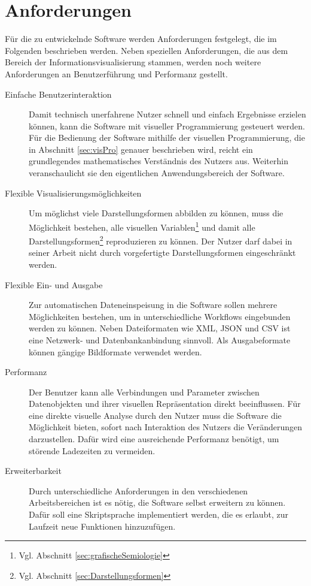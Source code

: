 \documentclass[a4paper, 
               12pt,
               DIV=calc,
               version=first,
               pdftex,
               headsepline,
               footsepline,
               bibtotocnumbered,
               liststotocnumbered]{scrreprt}
\begin{document}
\section{Anforderungen}
\label{sec:Anforderungen}
Für die zu entwickelnde Software werden Anforderungen festgelegt, die
im Folgenden beschrieben werden. Neben speziellen Anforderungen, die aus
dem Bereich der Informationsvisualisierung stammen, werden noch weitere
Anforderungen an Benutzerführung und Performanz gestellt.
\begin{description}
\item[Einfache Benutzerinteraktion]
Damit technisch unerfahrene Nutzer schnell und einfach Ergebnisse erzielen können, kann die Software
mit visueller Programmierung gesteuert werden. Für die Bedienung der Software mithilfe der visuellen
Programmierung, die in Abschnitt \ref{sec:visPro} genauer beschrieben wird,
reicht ein grundlegendes mathematisches Verständnis des Nutzers aus.
Weiterhin veranschaulicht sie den eigentlichen Anwendungsbereich der Software.
\item[Flexible Visualisierungsmöglichkeiten]
Um möglichst viele Darstellungsformen abbilden zu können, muss die 
Möglichkeit bestehen, alle visuellen Variablen\footnote{Vgl. Abschnitt
\ref{sec:grafischeSemiologie}} und damit alle Darstellungsformen\footnote{Vgl. Abschnitt
\ref{sec:Darstellungsformen}} reproduzieren zu können. Der Nutzer darf dabei
in seiner Arbeit nicht durch vorgefertigte Darstellungsformen
eingeschränkt werden.
\item[Flexible Ein- und Ausgabe]
Zur automatischen Dateneinspeisung in die Software sollen mehrere Möglichkeiten
bestehen, um in unterschiedliche Workflows eingebunden werden zu können.
Neben Dateiformaten wie XML, JSON und CSV ist eine Netzwerk- und
Datenbankanbindung sinnvoll. Als Ausgabeformate können gängige Bildformate
verwendet werden.
\item[Performanz]
Der Benutzer kann alle Verbindungen und Parameter zwischen Datenobjekten und ihrer
visuellen Repräsentation direkt beeinflussen. Für eine direkte visuelle Analyse
durch den Nutzer muss die Software die Möglichkeit bieten, sofort
nach Interaktion des Nutzers die Veränderungen darzustellen. Dafür wird eine
ausreichende Performanz benötigt, um störende Ladezeiten zu vermeiden.
\item[Erweiterbarkeit]
Durch unterschiedliche Anforderungen in den verschiedenen Arbeitsbereichen ist
es nötig, die Software selbst erweitern zu können. Dafür soll eine Skriptsprache
implementiert werden, die es erlaubt, zur Laufzeit neue Funktionen hinzuzufügen.

\end{description}
\end{document}
